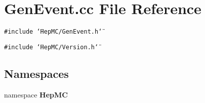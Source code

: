 \section{Gen\-Event.cc File Reference}
\label{GenEvent_8cc}
{\tt \#include \char`\"{}Hep\-MC/Gen\-Event.h\char`\"{}}\par
{\tt \#include \char`\"{}Hep\-MC/Version.h\char`\"{}}\par
\subsection*{Namespaces}
\begin{CompactItemize}
\item 
namespace {\bf Hep\-MC}
\end{CompactItemize}

